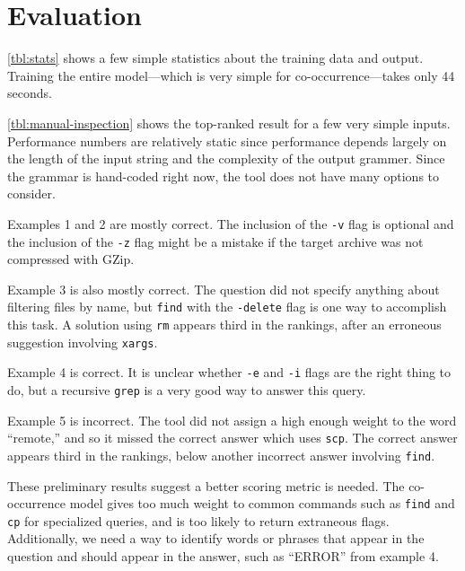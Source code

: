 \section{Evaluation}

\autoref{tbl:stats} shows a few simple statistics about the training data and
output. Training the entire model---which is very simple for co-occurrence---takes only
44 seconds.

\autoref{tbl:manual-inspection} shows the top-ranked result for a few very
simple inputs. Performance numbers are relatively static since performance
depends largely on the length of the input string and the complexity of the
output grammer. Since the grammar is hand-coded right now, the tool does not
have many options to consider.

Examples 1 and 2 are mostly correct. The inclusion of the \texttt{-v} flag is
optional and the inclusion of the \texttt{-z} flag might be a mistake if the
target archive was not compressed with GZip.

Example 3 is also mostly correct. The question did not specify anything about
filtering files by name, but \texttt{find} with the \texttt{-delete} flag is
one way to accomplish this task. A solution using \texttt{rm} appears third in
the rankings, after an erroneous suggestion involving \texttt{xargs}.

Example 4 is correct. It is unclear whether \texttt{-e} and \texttt{-i} flags
are the right thing to do, but a recursive \texttt{grep} is a very good way to
answer this query.

Example 5 is incorrect. The tool did not assign a high enough weight to the word
``remote,'' and so it missed the correct answer which uses \texttt{scp}. The
correct answer appears third in the rankings, below another incorrect answer
involving \texttt{find}.

These preliminary results suggest a better scoring metric is needed. The
co-occurrence model gives too much weight to common commands such as
\texttt{find} and \texttt{cp} for specialized queries, and is too likely to
return extraneous flags. Additionally, we need a way to identify words or
phrases that appear in the question and should appear in the answer, such as
``ERROR'' from example 4.


